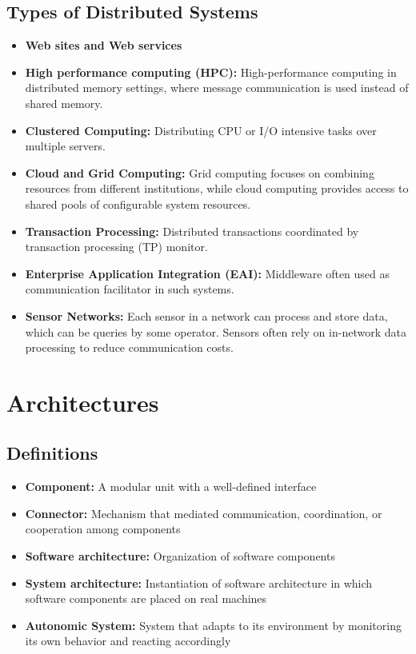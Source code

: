 \documentclass[12pt,titlepage]{article}
\begin{document}
      \subsection{Types of Distributed Systems}
        \begin{itemize}
          \item \textbf{Web sites and Web services}
          \item \textbf{High performance computing (HPC):} High-performance computing in distributed memory settings, where message communication is used instead of shared memory.
          \item \textbf{Clustered Computing:} Distributing CPU or I/O intensive tasks over multiple servers.
          \item \textbf{Cloud and Grid Computing:} Grid computing focuses on combining resources from different institutions, while cloud computing provides access to shared pools
          of configurable system resources.
          \item \textbf{Transaction Processing:} Distributed transactions coordinated by transaction processing (TP) monitor.
          \item \textbf{Enterprise Application Integration (EAI):} Middleware often used as communication facilitator in such systems.
          \item \textbf{Sensor Networks:} Each sensor in a network can process and store data, which can be queries by some operator. Sensors often rely on in-network data
          processing to reduce communication costs.
        \end{itemize}

  \section{Architectures}
    \subsection{Definitions}
      \begin{itemize}
        \item \textbf{Component:} A modular unit with a well-defined interface
        \item \textbf{Connector:} Mechanism that mediated communication, coordination, or cooperation among components
        \item \textbf{Software architecture:} Organization of software components
        \item \textbf{System architecture:} Instantiation of software architecture in which software components are placed on real machines
        \item \textbf{Autonomic System:} System that adapts to its environment by monitoring its own behavior and reacting accordingly
      \end{itemize}
\end{document}
